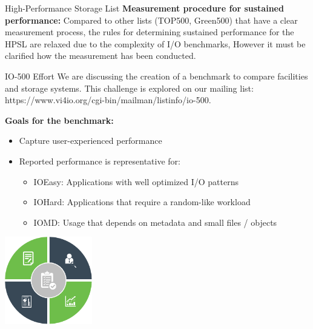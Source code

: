 \documentclass[portrait,a0paper,fontscale=0.4]{baposter}
\begin{document}
\begin{poster}
\begin{posterbox}[name=schedule,column=1,span=2, below=concept]{High-Performance Storage List}
\textbf{Measurement procedure for sustained performance:}
Compared to other lists (TOP500, Green500) that have a clear measurement process, the rules for determining sustained performance for the HPSL are relaxed due to the complexity of I/O benchmarks, However it must be clarified how the measurement has been conducted.
\end{posterbox}

\begin{posterbox}[name=HHCC,column=1,span=2, below=schedule, above=bottom]{IO-500 Effort}
We are discussing the creation of a benchmark to compare facilities and storage systems. This challenge is explored on our mailing list: https://www.vi4io.org/cgi-bin/mailman/listinfo/io-500. 

\textbf{Goals for the benchmark:}

\vspace*{-0.5em}

\begin{minipage}{10.5cm}
\begin{itemize}
\item Capture user-experienced performance %
\item Reported performance is representative for:
\vspace*{-0.5em}
\begin{itemize}
\item IOEasy: Applications with well optimized I/O patterns
\item IOHard: Applications that require a random-like workload
\item IOMD: Usage that depends on metadata and small files / objects
\end{itemize}
\end{itemize}
\end{minipage}
\qquad
\begin{minipage}{4cm}
\includegraphics[width=3.8cm]{border}
\end{minipage}


\end{posterbox}
\end{poster}
\end{document}
